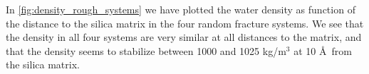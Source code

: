 In \cref{fig:density_rough_systems} we have plotted the water density as function of the distance to the silica matrix in the four random fracture systems. We see that the density in all four systems are very similar at all distances to the matrix, and that the density seems to stabilize between 1000 and 1025 kg/m$^3$ at 10 \AA\ from the silica matrix.  %
%
%
%
